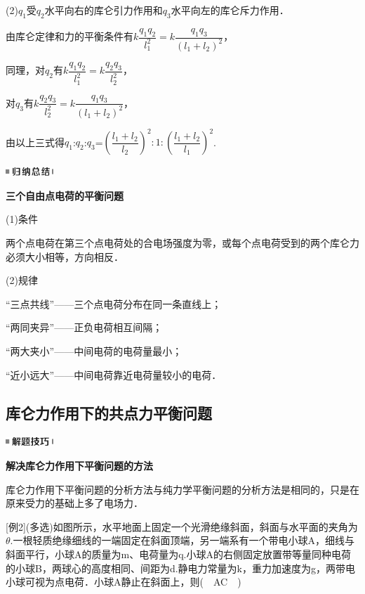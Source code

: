 \documentclass[cn,10.5pt,chinese,mac,chinesefont=founder]{elegantbook}
\begin{document}
(2)$q_1$受$q_2$水平向右的库仑引力作用和$q_3$水平向左的库仑斥力作用．

由库仑定律和力的平衡条件有$k\dfrac{q_1q_2}{l_1^2}=k\dfrac{q_1q_3}{(l_1+l_2)^2}$，

同理，对$q_2$有$k\dfrac{q_1q_2}{l_1^2}=k\dfrac{q_2q_3}{l_2^2}$，

对$q_3$有$k\dfrac{q_2q_3}{l_2^2}=k\dfrac{q_1q_3}{(l_1+l_2)^2}$，

由以上三式得$q_1$:$q_2$:$q_3$=$(\dfrac{l_1+l_2}{l_2} )^2:1:(\dfrac{l_1+l_2}{l_1} )^2$.

\begin{center}\includegraphics[width=0.70833in,height=0.125in]{media/image13.png}

\textbf{三个自由点电荷的平衡问题}
\end{center}


(1)条件

两个点电荷在第三个点电荷处的合电场强度为零，或每个点电荷受到的两个库仑力必须大小相等，方向相反．

(2)规律

``三点共线''------三个点电荷分布在同一条直线上；

``两同夹异''------正负电荷相互间隔；

``两大夹小''------中间电荷的电荷量最小；

``近小远大''------中间电荷靠近电荷量较小的电荷．
\newpage
\subsection{库仑力作用下的共点力平衡问题}

\begin{center}\includegraphics[width=0.70833in,height=0.125in]{media/image37.png}

\textbf{解决库仑力作用下平衡问题的方法}
\end{center}


库仑力作用下平衡问题的分析方法与纯力学平衡问题的分析方法是相同的，只是在原来受力的基础上多了电场力．

{[}例2{]}(多选)如图所示，水平地面上固定一个光滑绝缘斜面，斜面与水平面的夹角为$\theta$.一根轻质绝缘细线的一端固定在斜面顶端，另一端系有一个带电小球A，细线与斜面平行，小球A的质量为m、电荷量为q.小球A的右侧固定放置带等量同种电荷的小球B，两球心的高度相同、间距为d.静电力常量为k，重力加速度为g，两带电小球可视为点电荷．小球A静止在斜面上，则(　AC　)
\end{document}

